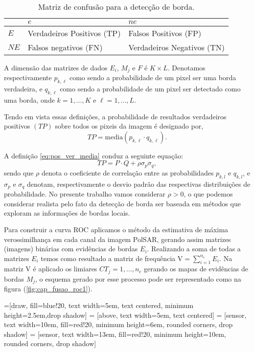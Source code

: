 \begin{table}[hbt]
	\centering
	\caption{Matriz de confusão para a detecção de borda.}\label{tab02:cap_fusao}
\begin{tabular}{@{}lll@{}} \toprule
	     & $e$  & $ne$  \\ \midrule
	$E$  & Verdadeiros Positivos (TP)& Falsos Positivos      (FP)  \\ 
	$NE$ & Falsos negativos      (FN)& Verdadeiros Negativos (TN)\\ \bottomrule  
\end{tabular}
\end{table}

A dimensão das matrizes de dados $E_i$, $M_j$ e $F$ é $K\times L$. Denotamos respectivamente $p_{k,\ell}$ como sendo a probabilidade de um pixel ser uma borda verdadeira, e $q_{k,\ell}$ como sendo a probabilidade de um pixel ser detectado como uma borda, onde $k=1,\dots,K$ e $\ell=1,\dots,L$. 

Tendo em vista essas definições, a probabilidade de resultados verdadeiros positivos $(TP)$ sobre todos os pixeis da imagem é designado por,
\begin{equation}\label{eq:pos_ver_media}
TP=\text{media}(p_{k,\ell}\cdot q_{k,\ell}).
\end{equation}

A definição \eqref{eq:pos_ver_media} conduz a seguinte equação:
\begin{equation}\label{eq:pos_ver}
TP=P \cdot Q + \rho \sigma_p \sigma_q,
\end{equation}
sendo que $\rho$ denota o coeficiente de correlação entre as probabilidades $p_{k,l}$ e $q_{k,l}$, e $\sigma_p$ e $\sigma_q$ denotam, respectivamente o desvio padrão das respectivas distribuições de probabilidade. No presente trabalho vamos considerar $\rho > 0$, o que podemos considerar realista pelo fato da detecção de borda ser baseada em métodos que exploram as informações de bordas locais.

Para construir a curva ROC aplicamos o método da estimativa de máxima verossimilhança em cada canal da imagem PolSAR, gerando assim matrizes (imagens) binárias com evidências de bordas $E_i$. Realizando a soma de todas a matrizes $E_i$ temos como resultado a matriz de frequência $\text{V}=\sum_{i=1}^{n_c}E_i$. Na matriz V é aplicado os limiares $CT_j=1,\dots,n_c$ gerando os mapas de evidências de bordas $M_j$, o esquema gerado por esse processo pode ser representado como na figura (\ref{fig:cap_fusao_roc1}).

=[draw, fill=blue!20, text width=5em, 
    text centered, minimum height=2.5em,drop shadow]
 = [above, text width=5em, text centered]
 = [sensor, text width=10em, fill=red!20, 
    minimum height=6em, rounded corners, drop shadow]
 = [sensor, text width=13em, fill=red!20, 
    minimum height=10em, rounded corners, drop shadow]
\def\blockdist{2.3}
\def\edgedist{2.5}

